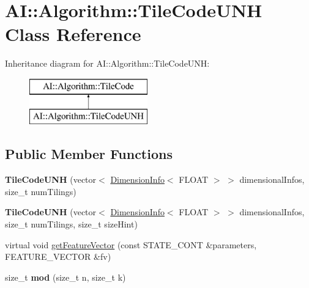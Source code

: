 \hypertarget{classAI_1_1Algorithm_1_1TileCodeUNH}{\section{A\-I\-:\-:Algorithm\-:\-:Tile\-Code\-U\-N\-H Class Reference}
\label{classAI_1_1Algorithm_1_1TileCodeUNH}
}
Inheritance diagram for A\-I\-:\-:Algorithm\-:\-:Tile\-Code\-U\-N\-H\-:\begin{figure}[H]
\begin{center}
\leavevmode
\includegraphics[height=2.000000cm]{classAI_1_1Algorithm_1_1TileCodeUNH}
\end{center}
\end{figure}
\subsection*{Public Member Functions}
\begin{DoxyCompactItemize}
\item 
\hypertarget{classAI_1_1Algorithm_1_1TileCodeUNH_abcbd8f8e4bcc48dda33a9e98a012fa5d}{{\bfseries Tile\-Code\-U\-N\-H} (vector$<$ \hyperlink{classAI_1_1Algorithm_1_1DimensionInfo}{Dimension\-Info}$<$ F\-L\-O\-A\-T $>$ $>$ dimensional\-Infos, size\-\_\-t num\-Tilings)}\label{classAI_1_1Algorithm_1_1TileCodeUNH_abcbd8f8e4bcc48dda33a9e98a012fa5d}

\item 
\hypertarget{classAI_1_1Algorithm_1_1TileCodeUNH_ac6d35486b3f5e94a6a6d95dd4a5e1e14}{{\bfseries Tile\-Code\-U\-N\-H} (vector$<$ \hyperlink{classAI_1_1Algorithm_1_1DimensionInfo}{Dimension\-Info}$<$ F\-L\-O\-A\-T $>$ $>$ dimensional\-Infos, size\-\_\-t num\-Tilings, size\-\_\-t size\-Hint)}\label{classAI_1_1Algorithm_1_1TileCodeUNH_ac6d35486b3f5e94a6a6d95dd4a5e1e14}

\item 
virtual void \hyperlink{classAI_1_1Algorithm_1_1TileCodeUNH_a7b13840ff09b20ff2ad06965f3f4800f}{get\-Feature\-Vector} (const S\-T\-A\-T\-E\-\_\-\-C\-O\-N\-T \&parameters, F\-E\-A\-T\-U\-R\-E\-\_\-\-V\-E\-C\-T\-O\-R \&fv)
\item 
\hypertarget{classAI_1_1Algorithm_1_1TileCodeUNH_a02daa0818beff76016b3d000a2c86b68}{size\-\_\-t {\bfseries mod} (size\-\_\-t n, size\-\_\-t k)}\label{classAI_1_1Algorithm_1_1TileCodeUNH_a02daa0818beff76016b3d000a2c86b68}

\end{DoxyCompactItemize}
